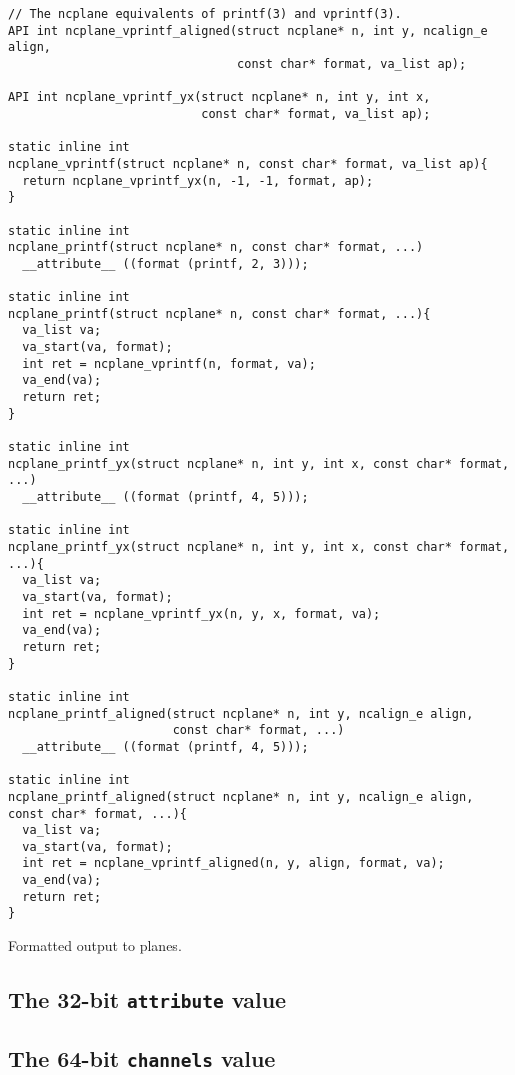 \begin{listing}[!htbp]
\begin{verbatim}
// The ncplane equivalents of printf(3) and vprintf(3).
API int ncplane_vprintf_aligned(struct ncplane* n, int y, ncalign_e align,
                                const char* format, va_list ap);

API int ncplane_vprintf_yx(struct ncplane* n, int y, int x,
                           const char* format, va_list ap);

static inline int
ncplane_vprintf(struct ncplane* n, const char* format, va_list ap){
  return ncplane_vprintf_yx(n, -1, -1, format, ap);
}

static inline int
ncplane_printf(struct ncplane* n, const char* format, ...)
  __attribute__ ((format (printf, 2, 3)));

static inline int
ncplane_printf(struct ncplane* n, const char* format, ...){
  va_list va;
  va_start(va, format);
  int ret = ncplane_vprintf(n, format, va);
  va_end(va);
  return ret;
}

static inline int
ncplane_printf_yx(struct ncplane* n, int y, int x, const char* format, ...)
  __attribute__ ((format (printf, 4, 5)));

static inline int
ncplane_printf_yx(struct ncplane* n, int y, int x, const char* format, ...){
  va_list va;
  va_start(va, format);
  int ret = ncplane_vprintf_yx(n, y, x, format, va);
  va_end(va);
  return ret;
}

static inline int
ncplane_printf_aligned(struct ncplane* n, int y, ncalign_e align,
                       const char* format, ...)
  __attribute__ ((format (printf, 4, 5)));

static inline int
ncplane_printf_aligned(struct ncplane* n, int y, ncalign_e align, const char* format, ...){
  va_list va;
  va_start(va, format);
  int ret = ncplane_vprintf_aligned(n, y, align, format, va);
  va_end(va);
  return ret;
}
\end{verbatim}
\caption{Formatted output to planes.}
\label{list:putc}
\end{listing}

\subsection{The 32-bit \texttt{attribute} value}
\label{sec:attribute}
\subsection{The 64-bit \texttt{channels} value}
\label{sec:channels}
